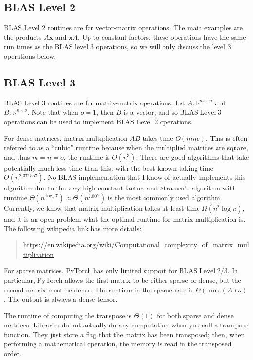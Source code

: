 \documentclass[10pt]{article}
\theoremstyle{definition}
\newcommand{\R}{\mathbb R}
\DeclareMathOperator{\nnz}{nnz}
\newcommand{\x}{\mathbf x}
\begin{document}
\newpage
\subsection{BLAS Level 2}

BLAS Level 2 routines are for vector-matrix operations.
The main examples are the products $A\x$ and $\x A$.
Up to constant factors, these operations have the same run times as the BLAS level 3 operations, so we will only discuss the level 3 operations below.

\subsection{BLAS Level 3}

BLAS Level 3 routines are for matrix-matrix operations.
Let $A : \R^{m\times n}$ and $B : \R^{n \times o}$.
Note that when $o=1$, then $B$ is a vector, and so BLAS Level 3 operations can be used to implement BLAS Level 2 operations.

For dense matrices, matrix multiplication $AB$ takes time $O(mno)$.
This is often referred to as a ``cubic'' runtime because when the multiplied matrices are square,
and thus $m=n=o$,
the runtime is $O(n^3)$.
There are good algorithms that take potentially much less time than this,
with the best known taking time $O(n^{2.371552})$.
No BLAS implementation that I know of actually implements this algorithm due to the very high constant factor,
and Strassen's algorithm with runtime $\Theta(n^{\log_2 7})\approx\Theta(n^{2.807})$ is the most commonly used algorithm.
Currently, we know that matrix multiplication takes at least time $\Omega(n^2\log n)$,
and it is an open problem what the optimal runtime for matrix multiplication is.
The following wikipedia link has more details:
\begin{quote}
    \url{https://en.wikipedia.org/wiki/Computational_complexity_of_matrix_multiplication}
\end{quote}

For sparse matrices, PyTorch has only limited support for BLAS Level 2/3.
In particular, PyTorch allows the first matrix to be either sparse or dense,
but the second matrix must be dense.
The runtime in the sparse case is $\Theta(\nnz(A)o)$.
The output is always a dense tensor.

The runtime of computing the transpose is $\Theta(1)$
for both sparse and dense matrices.
Libraries do not actually do any computation when you call a transpose function.
They just store a flag that the matrix has been transposed;
then, when performing a mathematical operation, the memory is read in the transposed order.
\end{document}
